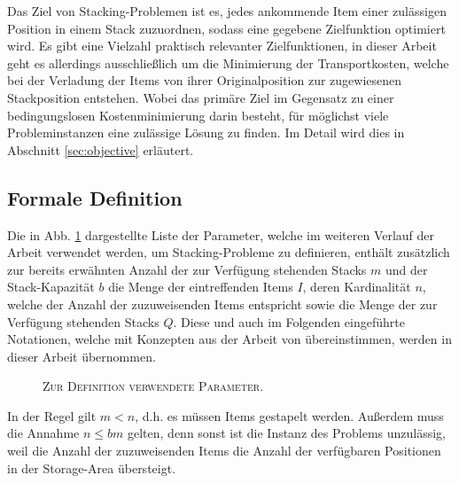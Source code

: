 Das Ziel von Stacking-Problemen ist es, jedes ankommende Item einer zulässigen Position in einem
Stack zuzuordnen, sodass eine gegebene Zielfunktion optimiert wird. Es gibt eine Vielzahl praktisch relevanter Zielfunktionen,
in dieser Arbeit geht es allerdings ausschließlich um die Minimierung der Transportkosten, welche bei der Verladung der Items von ihrer Originalposition zur zugewiesenen Stackposition entstehen. Wobei das primäre Ziel im Gegensatz zu einer bedingungslosen Kostenminimierung darin besteht, für möglichst viele Probleminstanzen eine zulässige Lösung zu finden. Im Detail wird dies in
Abschnitt \ref{sec:objective} erläutert.

\subsection{Formale Definition}
\label{sec:formal_definition}

Die in Abb. \ref{fig:parameters} dargestellte Liste der Parameter, welche im weiteren Verlauf der Arbeit verwendet
werden, um Stacking-Probleme zu definieren, enthält zusätzlich zur bereits erwähnten Anzahl der zur Verfügung stehenden
Stacks $m$ und der Stack-Kapazität $b$ die Menge der eintreffenden Items $I$, deren Kardinalität $n$, welche der Anzahl
der zuzuweisenden Items entspricht sowie die Menge der zur Verfügung stehenden Stacks $Q$. Diese und auch im Folgenden
eingeführte Notationen, welche mit Konzepten aus der Arbeit von \citet{Bruns2015} übereinstimmen,
werden in dieser Arbeit übernommen.

\begin{figure}[H]
\centering
{}
\caption{\textsc{Zur Definition verwendete Parameter}.}
\label{fig:parameters}
\end{figure}
In der Regel gilt $m < n$, d.h. es müssen Items gestapelt werden.
Außerdem muss die Annahme $n \leq bm$ gelten, denn sonst ist die Instanz des Problems unzulässig,
weil die Anzahl der zuzuweisenden Items die Anzahl der verfügbaren Positionen in der Storage-Area übersteigt.

